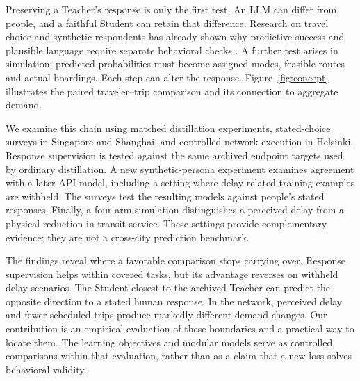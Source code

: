 Preserving a Teacher's response is only the first test. An LLM can differ from people, and a faithful Student can retain that difference. Research on travel choice and synthetic respondents has already shown why predictive success and plausible language require separate behavioral checks \citep{wang2020deep,martinbaos2023prediction,bisbee2024synthetic,liu2026persona}. A further test arises in simulation: predicted probabilities must become assigned modes, feasible routes and actual boardings. Each step can alter the response. Figure~\ref{fig:concept} illustrates the paired traveler--trip comparison and its connection to aggregate demand.

We examine this chain using matched distillation experiments, stated-choice surveys in Singapore and Shanghai, and controlled network execution in Helsinki. Response supervision is tested against the same archived endpoint targets used by ordinary distillation. A new synthetic-persona experiment examines agreement with a later API model, including a setting where delay-related training examples are withheld. The surveys test the resulting models against people's stated responses. Finally, a four-arm simulation distinguishes a perceived delay from a physical reduction in transit service. These settings provide complementary evidence; they are not a cross-city prediction benchmark.

The findings reveal where a favorable comparison stops carrying over. Response supervision helps within covered tasks, but its advantage reverses on withheld delay scenarios. The Student closest to the archived Teacher can predict the opposite direction to a stated human response. In the network, perceived delay and fewer scheduled trips produce markedly different demand changes. Our contribution is an empirical evaluation of these boundaries and a practical way to locate them. The learning objectives and modular models serve as controlled comparisons within that evaluation, rather than as a claim that a new loss solves behavioral validity.
